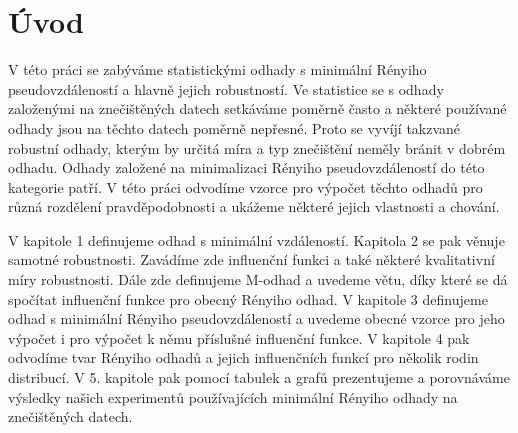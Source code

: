 \chapter*{Úvod}
 V této práci se zabýváme statistickými odhady s minimální Rényiho pseudovzdáleností a hlavně jejich robustností. Ve statistice se s odhady založenými na znečištěných da\-tech setkáváme poměrně často a některé používané odhady jsou na těchto datech poměrně nepřesné. Proto se vyvíjí takzvané robustní odhady, kterým by určitá míra a typ znečištění neměly bránit v dobrém odhadu. Odhady založené na minimalizaci Rényiho pseudo\-vzdá\-le\-nos\-tí do této kategorie patří. V této práci odvodíme vzorce pro výpočet těchto odhadů pro různá rozdělení pravděpodobnosti a ukážeme některé jejich vlastnosti a chování. 
 
V kapitole 1 definujeme odhad s minimální vzdáleností. Kapitola 2 se pak věnuje samotné robustnosti. Zavádíme zde influenční funkci a také některé kvalitativní míry robustnosti. Dále zde definujeme M-odhad a uvedeme větu, díky které se dá spočítat influenční funkce pro obecný Rényiho odhad. V kapitole 3 definujeme odhad s minimální Rényiho pseudovzdáleností a uvedeme obecné vzorce pro jeho výpočet i pro výpočet k němu příslušné influenční funkce. V kapitole 4 pak odvodíme tvar Rényiho odhadů a jejich influenčních funkcí pro několik rodin distribucí. V 5. kapitole pak pomocí tabulek a grafů prezentujeme a porovnáváme výsledky našich experimentů používajících minimální Rényiho odhady na znečištěných datech.